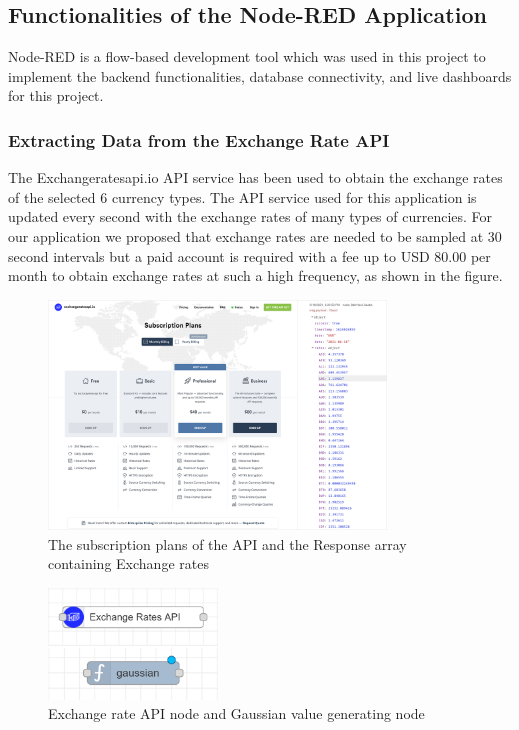 \subsection{Functionalities of the Node-RED Application}

Node-RED is a flow-based development tool which was used in this project to implement the backend functionalities, database connectivity, and live dashboards for this project.

\subsubsection{Extracting Data from the Exchange Rate API}

The Exchangeratesapi.io API service has been used to obtain the exchange rates of the selected 6 currency types. The API service used for this application is updated every second with the exchange rates of many types of currencies. For our application we proposed that exchange rates are needed to be sampled at 30 second intervals but a paid account is required with a fee up to USD 80.00 per month to obtain exchange rates at such a high frequency, as shown in the figure.

\begin{figure}[H]
    \centering
      \includegraphics[width=0.8\textwidth]{images/exapi.png}
    \caption{The subscription plans of the API and the Response array containing Exchange rates}
    \label{exapi}
\end{figure}

\begin{figure}[H]
    \centering
      \includegraphics[width=0.4\textwidth]{images/apinodes.png}
    \caption{ Exchange rate API node and Gaussian value generating node}
    \label{exapi}
\end{figure}


